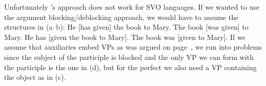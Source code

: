 
\noindent
Unfortunately \citeauthor{Haider86}'s approach does not work for SVO languages. If we wanted to use
the argument blocking/deblocking approach, we would have to assume the structures in (a--b):
\eal
\ex He [has given] the book to Mary.
\ex The book [was given] to Mary.
\ex He has [given the book to Mary].
\ex The book was [given to Mary].
\zl
If we assume that auxiliaries embed VPs as was argued on page~\pageref{page-English-Aux-VPs}, we run
into problems since the subject of the participle is blocked and the only VP we can form with the
participle is the one in (d), but for the perfect we also need a VP containing the object as
in (c).%











